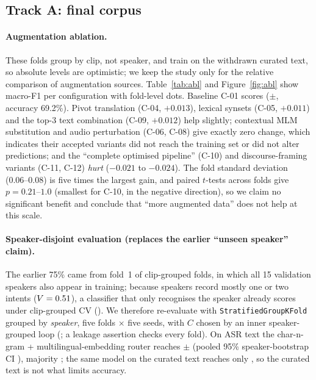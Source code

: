 \documentclass[sigconf,authordraft]{acmart}
\begin{document}
\subsection{Track A: final corpus}
\paragraph{Augmentation ablation.} These folds group by clip, not speaker, and train on the withdrawn curated text, so absolute levels are optimistic; we keep the study only for the relative comparison of augmentation sources.
Table~\ref{tab:abl} and Figure~\ref{fig:abl} show macro-F1 per configuration with fold-level dots. Baseline C-01 scores \AblBase{} ($\pm$\AblBaseSd{}, accuracy 69.2\%). Pivot translation (C-04, $+0.013$), lexical synsets (C-05, $+0.011$) and the top-3 text combination (C-09, $+0.012$) help slightly; contextual MLM substitution and audio perturbation (C-06, C-08) give exactly zero change, which indicates their accepted variants did not reach the training set or did not alter predictions; and the ``complete optimised pipeline'' (C-10) and discourse-framing variants (C-11, C-12) \emph{hurt} ($-0.021$ to $-0.024$). The fold standard deviation (0.06--0.08) is five times the largest gain, and paired $t$-tests across folds give $p=0.21$--$1.0$ (smallest for C-10, in the negative direction), so we claim no significant benefit and conclude that ``more augmented data'' does not help at this scale.
\paragraph{Speaker-disjoint evaluation (replaces the earlier ``unseen speaker'' claim).}
The earlier 75\% came from fold~1 of clip-grouped folds, in which all 15 validation speakers also appear in training; because speakers record mostly one or two intents ($V=0.51{}$), a classifier that only recognises the speaker already scores \SpkShortcut{} under clip-grouped CV (). We therefore re-evaluate with \texttt{StratifiedGroupKFold} grouped by \emph{speaker}, five folds $\times$ five seeds, with $C$ chosen by an inner speaker-grouped loop (; a leakage assertion checks every fold). On ASR text the char-n-gram + multilingual-embedding router reaches \SpkBase{} $\pm$ \SpkBaseSd{} (pooled 95\% speaker-bootstrap CI \SpkBaseCI{}), majority \SpkMaj{}; the same model on the curated text reaches only \SpkCurated{}, so the curated text is not what limits accuracy.
\end{document}
